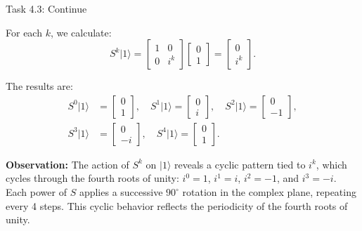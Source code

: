 \documentclass[aspectratio=169]{beamer}
\begin{document}
\begin{frame}[fragile]{Task 4.3: Continue}

{\footnotesize

For each \( k \), we calculate:
\[
S^k \lvert 1 \rangle = \begin{bmatrix}
1 & 0 \\
0 & i^k
\end{bmatrix} \begin{bmatrix} 0 \\ 1 \end{bmatrix} = \begin{bmatrix}
0 \\
i^k
\end{bmatrix}.
\]

The results are:
\[
\begin{aligned}
S^0 \lvert 1 \rangle &= \begin{bmatrix} 0 \\ 1 \end{bmatrix}, \quad
S^1 \lvert 1 \rangle = \begin{bmatrix} 0 \\ i \end{bmatrix}, \quad
S^2 \lvert 1 \rangle = \begin{bmatrix} 0 \\ -1 \end{bmatrix}, \\
S^3 \lvert 1 \rangle &= \begin{bmatrix} 0 \\ -i \end{bmatrix}, \quad
S^4 \lvert 1 \rangle = \begin{bmatrix} 0 \\ 1 \end{bmatrix}.
\end{aligned}
\]

\textbf{Observation:}
The action of \( S^k \) on \( \lvert 1 \rangle \) reveals a cyclic pattern tied to \( i^k \), which cycles through the fourth roots of unity: \( i^0 = 1 \), \( i^1 = i \), \( i^2 = -1 \), and \( i^3 = -i \). Each power of \( S \) applies a successive \( 90^\circ \) rotation in the complex plane, repeating every 4 steps. This cyclic behavior reflects the periodicity of the fourth roots of unity.
}

\end{frame}
\end{document}
